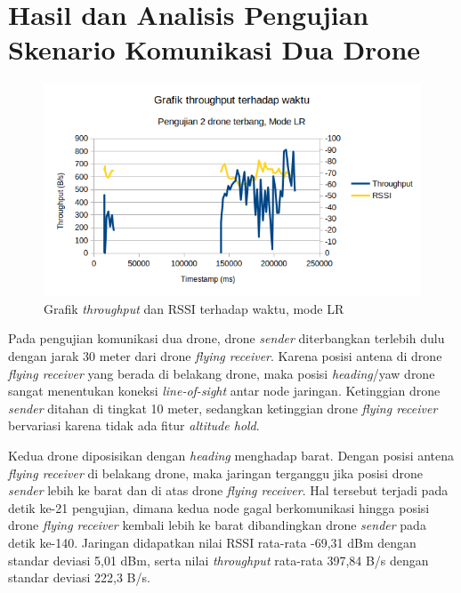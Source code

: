 \section{Hasil dan Analisis Pengujian Skenario Komunikasi Dua Drone}
\begin{figure}[H]
	\centering
	\includegraphics[scale=0.7]{./assets/Graphs/2Fly/Throughput-Time}
	\caption{Grafik \textit{throughput} dan RSSI terhadap waktu, mode LR}
\end{figure}
Pada pengujian komunikasi dua drone, drone \textit{sender} diterbangkan terlebih dulu dengan jarak 30 meter dari drone \textit{flying receiver}. Karena posisi antena di drone \textit{flying receiver} yang berada di belakang drone, maka posisi \textit{heading}/yaw drone sangat menentukan koneksi \textit{line-of-sight} antar node jaringan. Ketinggian drone \textit{sender} ditahan di tingkat 10 meter, sedangkan ketinggian drone \textit{flying receiver} bervariasi karena tidak ada fitur \textit{altitude hold}.

Kedua drone diposisikan dengan \textit{heading} menghadap barat. Dengan posisi antena \textit{flying receiver} di belakang drone, maka jaringan terganggu jika posisi drone \textit{sender} lebih ke barat dan di atas drone \textit{flying receiver}. Hal tersebut terjadi pada detik ke-21 pengujian, dimana kedua node gagal berkomunikasi hingga posisi drone \textit{flying receiver} kembali lebih ke barat dibandingkan drone \textit{sender} pada detik ke-140. Jaringan didapatkan nilai RSSI rata-rata -69,31 dBm dengan standar deviasi 5,01 dBm, serta nilai \textit{throughput} rata-rata 397,84 B/s dengan standar deviasi 222,3 B/s.

